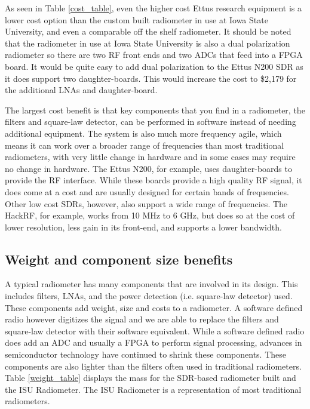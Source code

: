 As seen in Table \ref{cost_table}, even the higher cost Ettus research equipment is a lower cost option than the custom built radiometer in use at Iowa State University, and even a comparable off the shelf radiometer.  It should be noted that the radiometer in use at Iowa State University is also a dual polarization radiometer so there are two RF front ends and two ADCs that feed into a FPGA board.  It would be quite easy to add dual polarization to the Ettus N200 SDR as it does support two daughter-boards.  This would increase the cost to \$2,179 for the additional LNAs and daughter-board.

The largest cost benefit is that key components that you find in a radiometer, the filters and square-law detector, can be performed in software instead of needing additional equipment.  The system is also much more frequency agile, which means it can work over a broader range of frequencies than most traditional radiometers, with very little change in hardware and in some cases may require no change in hardware.  The Ettus N200, for example, uses daughter-boards to provide the RF interface.  While these boards provide a high quality RF signal, it does come at a cost and are usually designed for certain bands of frequencies.  Other low cost SDRs, however, also support a wide range of frequencies.  The HackRF, for example, works from 10 MHz to 6 GHz, but does so at the cost of lower resolution, less gain in its front-end, and supports a lower bandwidth.

\subsection{Weight and component size benefits}

A typical radiometer has many components that are involved in its design.  This includes filters, LNAs, and the power detection (i.e. square-law detector) used.  These components add weight, size and costs to a radiometer.  A software defined radio however digitizes the signal and we are able to replace the filters and square-law detector with their software equivalent.  While a software defined radio does add an ADC and usually a FPGA to perform signal processing, advances in semiconductor technology have continued to shrink these components.  These components are also lighter than the filters often used in traditional radiometers.  Table \ref{weight_table} displays the mass for the SDR-based radiometer built and the ISU Radiometer.  The ISU Radiometer is a representation of most traditional radiometers.

